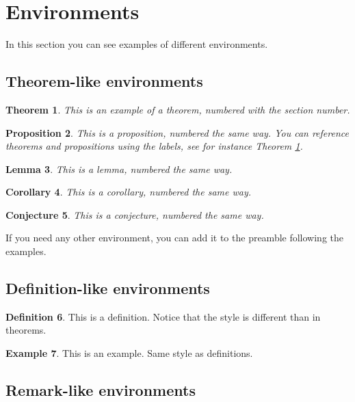 \documentclass[12,twoside]{MESIOTFM}
\newtheorem{theorem}{Theorem}[section]
\newtheorem{proposition}[theorem]{Proposition}
\newtheorem{lemma}[theorem]{Lemma}
\newtheorem{corollary}[theorem]{Corollary}
\newtheorem{conjecture}[theorem]{Conjecture}
\theoremstyle{definition}
\newtheorem{definition}[theorem]{Definition}
\newtheorem{example}[theorem]{Example}
\theoremstyle{remark}
\begin{document}
 \cleardoublepage

\section{Environments}

In this section you can see examples of different environments.

\subsection{Theorem-like environments}

\begin{theorem} \label{th:example}
This is an example of a theorem, numbered with the section number.
\end{theorem}

\begin{proposition}
This is a proposition, numbered the same way. You can reference theorems and propositions using the labels, see for instance Theorem \ref{th:example}.
\end{proposition}

\begin{lemma}
This is a lemma, numbered the same way.
\end{lemma}

\begin{corollary}
This is a corollary, numbered the same way.
\end{corollary}

\begin{conjecture}
This is a conjecture, numbered the same way.
\end{conjecture}

If you need any other environment, you can add it to the preamble following the examples.

\subsection{Definition-like environments}

\begin{definition}
This is a definition. Notice that the style is different than in theorems.
\end{definition}

\begin{example}
This is an example. Same style as definitions.
\end{example}

\subsection{Remark-like environments}
\end{document}
